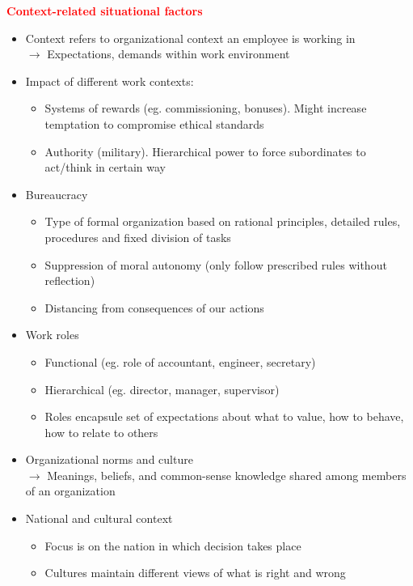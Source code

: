 \documentclass{article}
\DeclareRobustCommand{\k}[1]{\textcolor{red}{#1}}
\begin{document}
\k{\textbf{Context-related situational factors}}
\begin{itemize}
    \item Context refers to organizational context an employee is working in\\
    $\to$ Expectations, demands within work environment
    \item Impact of different work contexts:
    \begin{itemize}[label=$\to$]
        \item Systems of rewards (eg. commissioning, bonuses). Might increase temptation to compromise ethical standards
        \item Authority (military). Hierarchical power to force subordinates to act/think in certain way
    \end{itemize}
    \item Bureaucracy
    \begin{itemize}[label=$\to$]
        \item Type of formal organization based on rational principles, detailed rules, procedures and fixed division of tasks
        \item Suppression of moral autonomy (only follow prescribed rules without reflection)
        \item Distancing from consequences of our actions
    \end{itemize}
    \item Work roles
    \begin{itemize}[label=$\to$]
        \item Functional (eg. role of accountant, engineer, secretary)
        \item Hierarchical (eg. director, manager, supervisor)
        \item Roles encapsule set of expectations about what to value, how to behave, how to relate to others
    \end{itemize}
    \item Organizational norms and culture\\
    $\to$ Meanings, beliefs, and common-sense knowledge shared among members of an organization
    \item National and cultural context
    \begin{itemize}[label=$\to$]
        \item Focus is on the nation in which decision takes place
        \item Cultures maintain different views of what is right and wrong
    \end{itemize}
\end{itemize}
\end{document}
